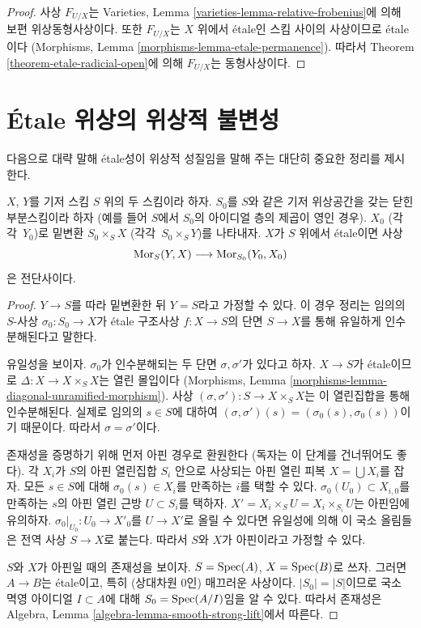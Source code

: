 \begin{proof}
사상 $F_{U/X}$는 Varieties, Lemma
\ref{varieties-lemma-relative-frobenius}에 의해 보편 위상동형사상이다.
또한 $F_{U/X}$는 $X$ 위에서 \'etale인 스킴 사이의 사상이므로
\'etale이다
(Morphisms, Lemma \ref{morphisms-lemma-etale-permanence}).
따라서 Theorem \ref{theorem-etale-radicial-open}에 의해
$F_{U/X}$는 동형사상이다.
\end{proof}





\section{\'Etale 위상의 위상적 불변성}
\label{section-topological-invariance}

\noindent
다음으로 대략 말해 \'etale성이 위상적 성질임을 말해 주는
대단히 중요한 정리를 제시한다.

\begin{theorem}
\label{theorem-etale-topological}
$X$, $Y$를 기저 스킴 $S$ 위의 두 스킴이라 하자.
$S_0$를 $S$와 같은 기저 위상공간을 갖는 닫힌 부분스킴이라 하자
(예를 들어 $S$에서 $S_0$의 아이디얼 층의 제곱이 영인 경우).
$X_0$ (각각\ $Y_0$)로 밑변환 $S_0 \times_S X$
(각각\ $S_0 \times_S Y$)를 나타내자.
$X$가 $S$ 위에서 \'etale이면 사상
$$
\mathop{\mathrm{Mor}}\nolimits_S(Y, X) \longrightarrow \mathop{\mathrm{Mor}}\nolimits_{S_0}(Y_0, X_0)
$$
은 전단사이다.
\end{theorem}

\begin{proof}
$Y \to S$를 따라 밑변환한 뒤 $Y = S$라고 가정할 수 있다.
이 경우 정리는 임의의 $S$-사상 $\sigma_0 : S_0 \to X$가
\'etale 구조사상 $f : X \to S$의 단면 $S \to X$를 통해
유일하게 인수분해된다고 말한다.

\medskip\noindent
유일성을 보이자. $\sigma_0$가 인수분해되는 두 단면
$\sigma, \sigma'$가 있다고 하자. $X \to S$가 \'etale이므로
$\Delta : X \to X \times_S X$는 열린 몰입이다
(Morphisms, Lemma
\ref{morphisms-lemma-diagonal-unramified-morphism}).
사상 $(\sigma, \sigma') : S \to X \times_S X$는 이 열린집합을
통해 인수분해된다. 실제로 임의의 $s \in S$에 대하여
$(\sigma, \sigma')(s) = (\sigma_0(s), \sigma_0(s))$이기 때문이다.
따라서 $\sigma = \sigma'$이다.

\medskip\noindent
존재성을 증명하기 위해 먼저 아핀 경우로 환원한다
(독자는 이 단계를 건너뛰어도 좋다).
각 $X_i$가 $S$의 아핀 열린집합 $S_i$ 안으로 사상되는
아핀 열린 피복 $X = \bigcup X_i$를 잡자.
모든 $s \in S$에 대해 $\sigma_0(s) \in X_i$를 만족하는
$i$를 택할 수 있다.
$\sigma_0(U_0) \subset X_{i, 0}$를 만족하는 $s$의
아핀 열린 근방 $U \subset S_i$를 택하자.
$X' = X_i \times_S U = X_i \times_{S_i} U$는 아핀임에 유의하자.
$\sigma_0|_{U_0} : U_0 \to X'_0$를 $U \to X'$로 올릴 수 있다면
유일성에 의해 이 국소 올림들은 전역 사상 $S \to X$로 붙는다.
따라서 $S$와 $X$가 아핀이라고 가정할 수 있다.

\medskip\noindent
$S$와 $X$가 아핀일 때의 존재성을 보이자.
$S = \mathop{\mathrm{Spec}}(A)$, $X = \mathop{\mathrm{Spec}}(B)$로 쓰자. 그러면 $A \to B$는
\'etale이고, 특히 (상대차원 $0$인) 매끄러운 사상이다.
$|S_0| = |S|$이므로 국소 멱영 아이디얼 $I \subset A$에 대해
$S_0 = \mathop{\mathrm{Spec}}(A/I)$임을 알 수 있다. 따라서 존재성은
Algebra, Lemma \ref{algebra-lemma-smooth-strong-lift}에서 따른다.
\end{proof}

